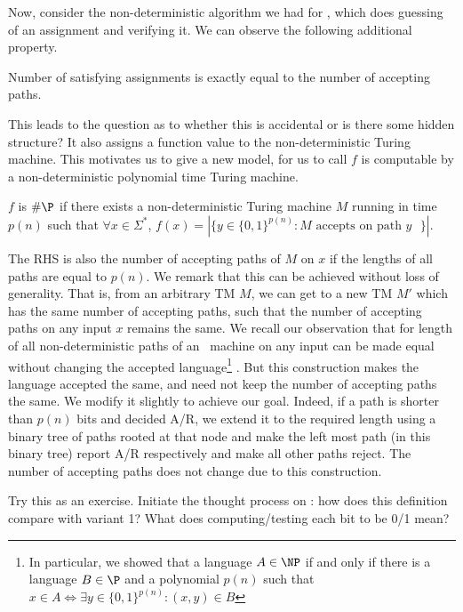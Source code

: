 \documentclass{report}
\begin{document}
Now, consider the non-deterministic algorithm
we had for \SAT, which does guessing of an assignment and verifying it. 
We can observe the following additional property.
\begin{observation}
Number of satisfying assignments is exactly equal to the number of accepting
paths.
\end{observation}
This leads to the question as to whether this is accidental or is there some
hidden structure? It also assigns a function value to the non-deterministic Turing machine.
This motivates us to give a new model, for us to call $f$ is computable by a non-deterministic polynomial time Turing machine.

\begin{definition}
$f$ is $\#\P$ if there exists a non-deterministic Turing machine $M$ running in time $p(n)$ such that 
$\forall x \in \Sigma^*$, $f(x) = \left| \{ y \in \{0,1\}^{p(n)}  : M \textrm{ accepts on path $y$ } \} \right|$.
\end{definition}

\begin{remark}
The RHS is also the number of accepting paths of $M$ on $x$ if the lengths of all paths are equal to $p(n)$.
We remark that this can be achieved without loss of generality. That is, from an arbitrary TM $M$, we can get to a new TM $M'$ which has the same number of accepting paths, such that the number of accepting paths on any input $x$ remains the same. We recall our observation that for length of all non-deterministic paths of an \NP~machine on any input can be made equal without changing the accepted language\footnote{In particular, we showed that a language $A \in \NP$ if and only if there is a language $B \in \P$ and a polynomial $p(n)$ such that $x \in A \iff \exists y \in \{0,1\}^{p(n)} : (x,y) \in B$} . But this construction makes the language accepted the same, and need not keep the number of accepting paths the same. We modify it slightly to achieve our goal.  Indeed, if a path is shorter than $p(n)$ bits and decided A/R, we extend it to the required length using a binary tree of paths rooted at that node and make the left most path (in this binary tree) report A/R respectively and make all other paths reject. The number of accepting paths does not change due to this construction.
\end{remark}

\begin{remark}
Try this as an exercise. Initiate the thought process on : how does this definition compare with variant 1? What does computing/testing each bit to be 0/1 mean?
\end{remark}
\end{document}
